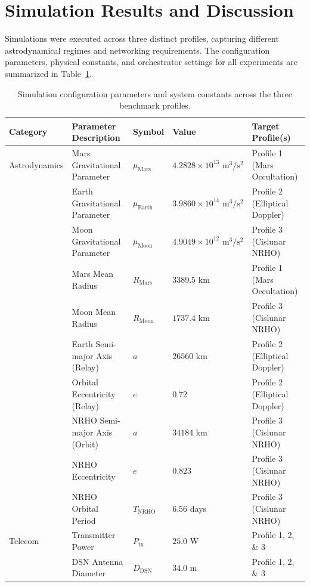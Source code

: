 \documentclass[a4paper,fleqn]{cas-sc}
\begin{document}
\section{Simulation Results and Discussion}
\label{sec:results}
Simulations were executed across three distinct profiles, capturing different astrodynamical regimes and networking requirements. The configuration parameters, physical constants, and orchestrator settings for all experiments are summarized in Table~\ref{tab:parameters}.

\begin{table}[htbp]
\centering
\caption{Simulation configuration parameters and system constants across the three benchmark profiles.}
\label{tab:parameters}
\footnotesize
\begin{tabular}{p{2.0cm}p{3.3cm}p{1.2cm}p{2.6cm}p{3.7cm}}
\toprule
\textbf{Category} & \textbf{Parameter Description} & \textbf{Symbol} & \textbf{Value} & \textbf{Target Profile(s)} \\
\midrule
Astrodynamics & Mars Gravitational Parameter & $\mu_{\text{Mars}}$ & $4.2828 \times 10^{13} \text{ m}^3/\text{s}^2$ & Profile 1 (Mars Occultation) \\
 & Earth Gravitational Parameter & $\mu_{\text{Earth}}$ & $3.9860 \times 10^{14} \text{ m}^3/\text{s}^2$ & Profile 2 (Elliptical Doppler) \\
 & Moon Gravitational Parameter & $\mu_{\text{Moon}}$ & $4.9049 \times 10^{12} \text{ m}^3/\text{s}^2$ & Profile 3 (Cislunar NRHO) \\
 & Mars Mean Radius & $R_{\text{Mars}}$ & $3389.5$ km & Profile 1 (Mars Occultation) \\
 & Moon Mean Radius & $R_{\text{Moon}}$ & $1737.4$ km & Profile 3 (Cislunar NRHO) \\
 & Earth Semi-major Axis (Relay) & $a$ & $26560$ km & Profile 2 (Elliptical Doppler) \\
 & Orbital Eccentricity (Relay) & $e$ & $0.72$ & Profile 2 (Elliptical Doppler) \\
 & NRHO Semi-major Axis (Orbit) & $a$ & $34184$ km & Profile 3 (Cislunar NRHO) \\
 & NRHO Eccentricity & $e$ & $0.823$ & Profile 3 (Cislunar NRHO) \\
 & NRHO Orbital Period & $T_{\text{NRHO}}$ & $6.56$ days & Profile 3 (Cislunar NRHO) \\
\midrule
Telecom & Transmitter Power & $P_{\text{tx}}$ & $25.0$ W & Profile 1, 2, \& 3 \\
 & DSN Antenna Diameter & $D_{\text{DSN}}$ & $34.0$ m & Profile 1, 2, \& 3 \\

\end{tabular}
\end{table}
\end{document}
